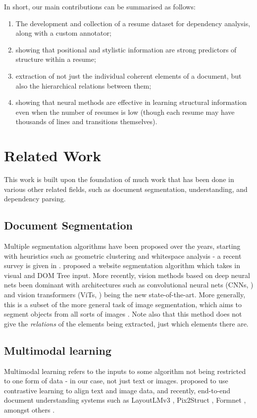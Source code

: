 \documentclass[11pt]{article}
\begin{document}
In short, our main contributions can be summarised as follows:
\begin{enumerate}
	\item The development and collection of a resume dataset for dependency analysis, along with a custom annotator;
	\item showing that positional and stylistic information are strong predictors of structure within a resume;
	\item extraction of not just the individual coherent elements of a document, but also the hierarchical relations between them;
	\item showing that neural methods are effective in learning structural information even when the number of resumes is low (though each resume may have thousands of lines and transitions themselves).
\end{enumerate}
\section{Related Work}

This work is built upon the foundation of much work that has been done in various other related fields, such as document segmentation, understanding, and dependency parsing. 

\subsection{Document Segmentation}
	Multiple segmentation algorithms have been proposed over the years, starting with heuristics such as geometric clustering and whitespace analysis - a recent survey is given in \citet{binmakhashen2019document}. \citet{cai2003vips} proposed a website segmentation algorithm which takes in visual and DOM Tree input. More recently, vision methods based on deep neural nets been dominant with architectures such as convolutional neural nets (CNNs, \citet{li2021survey, xu2021page}) and vision transformers (ViTs, \citet{han2022survey}) being the new state-of-the-art. More generally, this is a subset of the more general task of image segmentation, which aims to segment objects from all sorts of images \citep{kirillov2023segment}. Note also that this method does not give the \emph{relations} of the elements being extracted, just which elements there are.
\subsection{Multimodal learning}
	Multimodal learning refers to the inputs to some algorithm not being restricted to one form of data - in our case, not just text or images. \citet{radford2021learning} proposed to use contrastive learning to align text and image data, and recently, end-to-end document understanding systems such as LayoutLMv3 \citep{huang2022layoutlmv3}, Pix2Struct \citep{lee2022pix2struct}, Formnet \citep{lee2022formnet}, amongst others \citep{kim2022ocr, davis2023end}.
\end{document}
